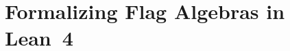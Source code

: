 \documentclass{article}
\newcommand{\tdensity}[2]{\pi(#1;\,#2)}
\begin{document}
%


\section{Formalizing Flag Algebras in Lean~4}
\label{sec:abstract}
\end{document}
